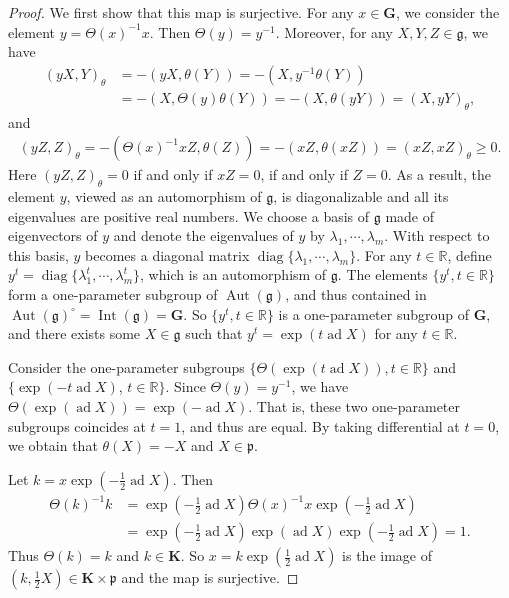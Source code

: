 \documentclass[12pt]{amsart}
\begin{document}
\begin{proof}
    We first show that this map is surjective.
    For any $x\in \mathbf{G}$, we consider the element $y=\Theta(x)^{-1}x$.
    Then $\Theta(y)=y^{-1}$.
    Moreover, for any $X,Y,Z\in \mathfrak{g}$, we have 
    \begin{align*}
        (yX,Y)_{\theta}&=-(yX,\theta(Y))=-(X,y^{-1}\theta(Y))\\
        &=-(X,\Theta(y)\theta(Y))=-(X,\theta(yY))=(X,yY)_{\theta},
    \end{align*}
and
\begin{align*}
    (yZ,Z)_{\theta}=-(\Theta(x)^{-1}xZ,\theta(Z))=-(xZ,\theta(xZ))=(xZ,xZ)_{\theta}\geq 0.
\end{align*}
Here $ (yZ,Z)_{\theta}=0$ if and only if $xZ=0$, if and only if $Z=0$.
As a result, the element $y$, viewed as an automorphism of $\mathfrak{g}$, is diagonalizable and all its eigenvalues are positive real numbers.
We choose a basis of $\mathfrak{g}$ made of eigenvectors of $y$ and denote the eigenvalues of $y$ by $\lambda_1,\cdots,\lambda_m$.
With respect to this basis, $y$ becomes a diagonal matrix $\operatorname{diag}\{\lambda_1,\cdots,\lambda_m\}$.
For any $t\in \mathbb{R}$, define $y^t=\operatorname{diag}\{\lambda_1^t,\cdots,\lambda_m^t\}$, which is an automorphism of $\mathfrak{g}$.
The elements $\{y^t,t\in \mathbb{R}\}$ form a one-parameter subgroup of $\operatorname{Aut}(\mathfrak{g})$, and thus contained in $\operatorname{Aut}(\mathfrak{g})^{\circ}=\operatorname{Int}(\mathfrak{g})=\mathbf{G}$.
So $\{y^t,t\in \mathbb{R}\}$ is a one-parameter subgroup of $\mathbf{G}$, and there exists some $X\in \mathfrak{g}$ such that $y^t=\operatorname{exp}(t\operatorname{ad}X)$ for any $t\in \mathbb{R}$.

Consider the one-parameter subgroups $\{\Theta(\operatorname{exp}(t\operatorname{ad}X)),t\in \mathbb{R}\}$ and $\{\operatorname{exp}(-t\operatorname{ad}X)$, $t\in \mathbb{R}\}$. 
Since $\Theta(y)=y^{-1}$, we have $\Theta(\operatorname{exp}(\operatorname{ad}X))=\operatorname{exp}(-\operatorname{ad}X)$.
That is, these two one-parameter subgroups coincides at $t=1$, and thus are equal.
By taking differential at $t=0$, we obtain that $\theta(X)=-X$ and $X\in \mathfrak{p}$.

Let $k=x\operatorname{exp}(-\frac{1}{2}\operatorname{ad}X)$.
Then 
\begin{align*}
    \Theta(k)^{-1}k&=\operatorname{exp}(-\frac{1}{2}\operatorname{ad}X) \Theta(x)^{-1}x \operatorname{exp}(-\frac{1}{2}\operatorname{ad}X)\\
    &=\operatorname{exp}(-\frac{1}{2}\operatorname{ad}X)\operatorname{exp}(\operatorname{ad}X)\operatorname{exp}(-\frac{1}{2}\operatorname{ad}X)=1.
\end{align*}
Thus $\Theta(k)=k$ and $k\in \mathbf{K}$.
So $x=k\operatorname{exp}(\frac{1}{2}\operatorname{ad}X)$ is the image of $(k,\frac{1}{2}X)\in \mathbf{K}\times \mathfrak{p}$ and the map is surjective.


\end{proof}
\end{document}
